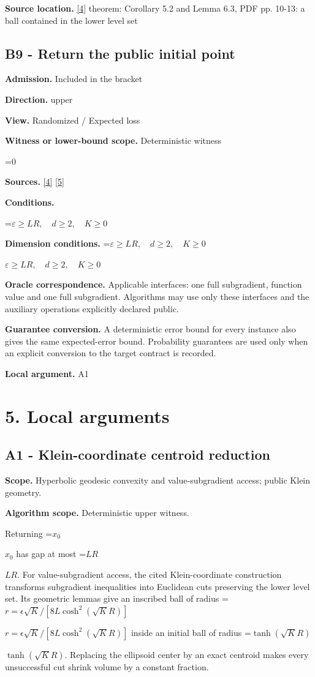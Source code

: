 \documentclass[10pt,a4paper]{article}
\newcommand{\AtlasMath}[1]{\par\begingroup\centering\setbox0=\hbox{$\displaystyle #1$}\ifdim\wd0>1.4\linewidth\typeout{ATLAS WIDE FORMULA: \the\wd0}\fi\ifdim\wd0>\linewidth\resizebox{\linewidth}{!}{\box0}\else\box0\fi\par\endgroup}
\newcommand{\AtlasInlineMath}[1]{\begingroup\setbox0=\hbox{$#1$}\ifdim\wd0>.4\linewidth\endgroup\AtlasMath{#1}\else\endgroup$#1$\fi}
\begin{document}
\textbf{Source location.} \href{https://arxiv.org/pdf/2605.17540v4}{[4]} theorem: Corollary 5.2 and Lemma 6.3, PDF pp. 10-13: a ball contained in the lower level set

\subsection{B9 - Return the public initial point}
\textbf{Admission.} Included in the bracket

\textbf{Direction.} upper

\textbf{View.} Randomized / Expected loss

\textbf{Witness or lower-bound scope.} Deterministic witness

\AtlasMath{0}
\textbf{Sources.} \href{https://arxiv.org/pdf/2605.17540v4}{[4]} \href{https://arxiv.org/pdf/1405.4980}{[5]}

\textbf{Conditions.} 
\AtlasMath{\varepsilon\ge LR,\quad d\ge2,\quad K\ge0}


\textbf{Dimension conditions.} \AtlasInlineMath{\varepsilon\ge LR,\quad d\ge2,\quad K\ge0}

\textbf{Oracle correspondence.} Applicable interfaces: one full subgradient, function value and one full subgradient. Algorithms may use only these interfaces and the auxiliary operations explicitly declared public.

\textbf{Guarantee conversion.} A deterministic error bound for every instance also gives the same expected-error bound. Probability guarantees are used only when an explicit conversion to the target contract is recorded.

\textbf{Local argument.} A1

\section{5. Local arguments}
\subsection{A1 - Klein-coordinate centroid reduction}
\textbf{Scope.} Hyperbolic geodesic convexity and value-subgradient access; public Klein geometry.

\textbf{Algorithm scope.} Deterministic upper witness.

Returning \AtlasInlineMath{x_0} has gap at most \AtlasInlineMath{LR}. For value-subgradient access, the cited Klein-coordinate construction transforms subgradient inequalities into Euclidean cuts preserving the lower level set. Its geometric lemmas give an inscribed ball of radius
\AtlasInlineMath{r=\epsilon\sqrt K/[8L\cosh^2(\sqrt KR)]}
inside an initial ball of radius \AtlasInlineMath{\tanh(\sqrt KR)}. Replacing the ellipsoid center by an exact centroid makes every unsuccessful cut shrink volume by a constant fraction.
\end{document}
